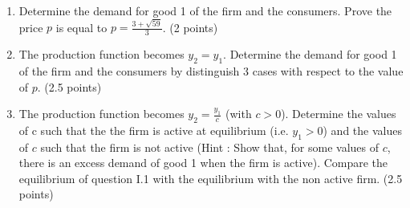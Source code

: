 \documentclass[11pt]{article} %
\begin{document}
\begin{enumerate}

\item Determine the demand for good 1 of the firm and the consumers. Prove the price $p$ is equal to $p =\frac{3+\sqrt{59}}{3}$. (2 points) 
\item The production function becomes $y_2 = y_1$. Determine the demand for good 1 of the firm and the consumers by distinguish 3 cases with respect to the value of $p$. (2.5 points)
\item The production function becomes $y_2 = \frac{y_1}{c}$ (with $c>0$). Determine the values of c such that the the firm is active at equilibrium (i.e. $y_1 > 0$) and the values of $c$ such that the firm is not active (Hint : Show that, for some values of $c$, there is
an excess demand of good 1 when the firm is active). Compare the equilibrium of question I.1 with the equilibrium with the non active firm. (2.5 points)

\end{enumerate}


 
\end{document}
